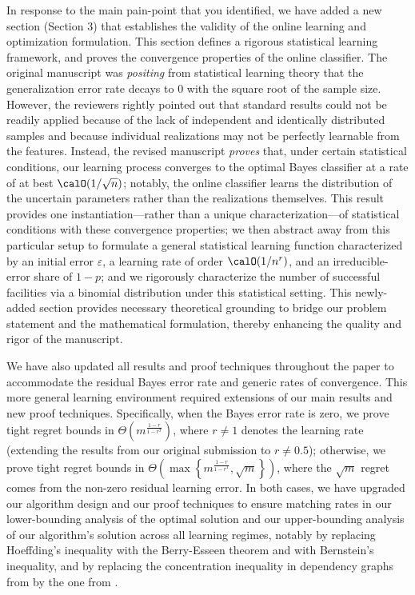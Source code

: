 \documentclass[11pt]{article}
\begin{document}
In response to the main pain-point that you identified, we have added a new section (Section 3) that establishes the validity of the online learning and optimization formulation. This section defines a rigorous statistical learning framework, and proves the convergence properties of the online classifier. The original manuscript was \textit{positing} from statistical learning theory that the generalization error rate decays to 0 with the square root of the sample size. However, the reviewers rightly pointed out that standard results could not be readily applied because of the lack of independent and identically distributed samples and because individual realizations may not be perfectly learnable from the features. Instead, the revised manuscript \textit{proves} that, under certain statistical conditions, our learning process converges to the optimal Bayes classifier at a rate of at best $\calO(1/\sqrt{n})$; notably, the online classifier learns the distribution of the uncertain parameters rather than the realizations themselves. This result provides one instantiation—rather than a unique characterization—of statistical conditions with these convergence properties; we then abstract away from this particular setup to formulate a general statistical learning function characterized by an initial error $\varepsilon$, a learning rate of order $\calO(1/n^{r})$, and an irreducible-error share of $1-p$; and we rigorously characterize the number of successful facilities via a binomial distribution under this statistical setting. This newly-added section provides necessary theoretical grounding to bridge our problem statement and the mathematical formulation, thereby enhancing the quality and rigor of the manuscript.

We have also updated all results and proof techniques throughout the paper to accommodate the residual Bayes error rate and generic rates of convergence. This more general learning environment required extensions of our main results and new proof techniques. Specifically, when the Bayes error rate is zero, we prove tight regret bounds in $\Theta\left(m^{\frac{1-r}{1-r^T}}\right)$, where $r\neq1$ denotes the learning rate (extending the results from our original submission to $r\neq0.5$); otherwise, we prove tight regret bounds in $\Theta\left(\max\left\{m^{\frac{1-r}{1-r^T}},\sqrt{m}\right\}\right)$, where the $\sqrt{m}$ regret comes from the non-zero residual learning error. In both cases, we have upgraded our algorithm design and our proof techniques to ensure matching rates in our lower-bounding analysis of the optimal solution and our upper-bounding analysis of our algorithm's solution across all learning regimes, notably by replacing Hoeffding's inequality with the Berry-Esseen theorem and with Bernstein's inequality, and by replacing the concentration inequality in dependency graphs from \cite{janson2004large} by the one from \cite{janisch2024berry}.
\end{document}
